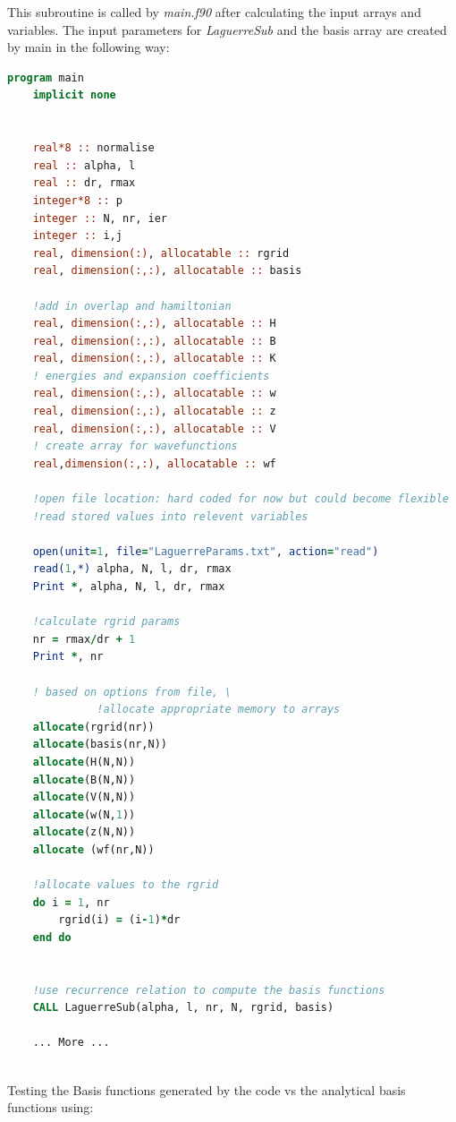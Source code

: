\documentclass{article}
\begin{document}
    This subroutine is called by \textit{main.f90} after calculating the input arrays and variables. The input parameters for \textit{LaguerreSub} and the basis array are created by main in the following way:
\begin{lstlisting}[language=Fortran]
program main
	implicit none
	
	
	real*8 :: normalise
	real :: alpha, l
	real :: dr, rmax
	integer*8 :: p
	integer :: N, nr, ier
	integer :: i,j
	real, dimension(:), allocatable :: rgrid
	real, dimension(:,:), allocatable :: basis
	
	!add in overlap and hamiltonian
	real, dimension(:,:), allocatable :: H
	real, dimension(:,:), allocatable :: B
	real, dimension(:,:), allocatable :: K
	! energies and expansion coefficients
	real, dimension(:,:), allocatable :: w
	real, dimension(:,:), allocatable :: z
	real, dimension(:,:), allocatable :: V
	! create array for wavefunctions
	real,dimension(:,:), allocatable :: wf
	
	!open file location: hard coded for now but could become flexible
	!read stored values into relevent variables
	
	open(unit=1, file="LaguerreParams.txt", action="read")
	read(1,*) alpha, N, l, dr, rmax
	Print *, alpha, N, l, dr, rmax
	
	!calculate rgrid params
	nr = rmax/dr + 1
	Print *, nr
	
	! based on options from file, \
	          !allocate appropriate memory to arrays
	allocate(rgrid(nr))
	allocate(basis(nr,N))
	allocate(H(N,N))
	allocate(B(N,N))
	allocate(V(N,N))
	allocate(w(N,1))
	allocate(z(N,N))
	allocate (wf(nr,N))
	
	!allocate values to the rgrid
	do i = 1, nr
		rgrid(i) = (i-1)*dr
	end do
	
	
	!use recurrence relation to compute the basis functions
	CALL LaguerreSub(alpha, l, nr, N, rgrid, basis)
	
	... More ...
	
\end{lstlisting}
    
    
    Testing the Basis functions generated by the code vs the analytical basis functions using:
    
\end{document}
